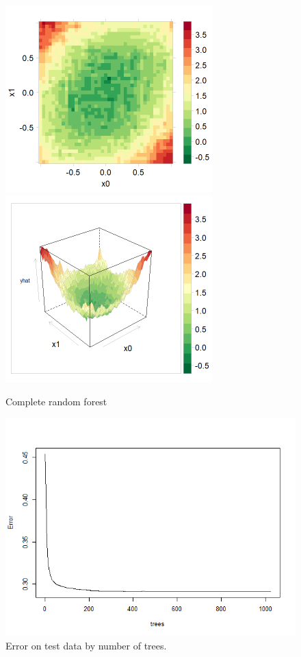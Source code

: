 \documentclass[10pt,openany]{article}
\numberwithin{definition}{section}
\numberwithin{example}{section}
\numberwithin{equation}{section}
\numberwithin{figure}{section}
\begin{document}
\begin{figure}
\noindent \begin{centering}
\includegraphics[width=80mm]{../fig/rf-1024-tree-levelplot}~
\includegraphics[width=80mm]{../fig/rf-1024-tree-wireframe}
\par\end{centering}

\protect\caption{\label{fig:random-forest}Complete random forest}
\end{figure}
\begin{figure}
\noindent \begin{centering}
\includegraphics[width=12cm]{../fig/rf-1024-tree-forest}
\par\end{centering}

\protect\caption{
\label{fig:Error-on-independent}Error on test data by number of trees.}
\end{figure}
\end{document}
